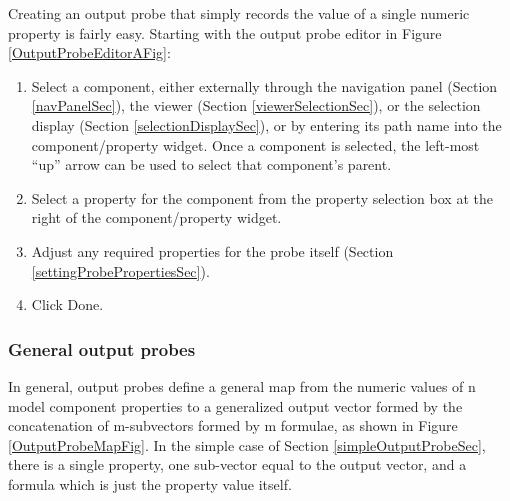 \documentclass{article}
\begin{document}
Creating an output probe that simply records the value of a single
numeric property is fairly easy. Starting with the output
probe editor in Figure \ref{OutputProbeEditorAFig}:

\begin{enumerate}

\item Select a component, either externally through the navigation panel
(Section \ref{navPanelSec}), the viewer (Section \ref{viewerSelectionSec}), or the selection
display (Section \ref{selectionDisplaySec}), or by entering its path name into the
component/property widget. Once a component is selected,
the left-most ``up'' arrow can be used to select that
component's parent.

\item Select a property for the component from the property
selection box at the right of the component/property widget.

\item Adjust any required properties for the probe itself 
(Section \ref{settingProbePropertiesSec}).

\item Click {\sf Done}.

\end{enumerate}

\subsubsection{General output probes}

In general, output probes define a general map from the numeric values
of n model component properties to a generalized output vector formed by the
concatenation of m-subvectors formed by m formulae, as shown
in Figure \ref{OutputProbeMapFig}. In the simple case of Section \ref{simpleOutputProbeSec},
there is a single property, one sub-vector equal to the output
vector, and a formula which is just the property value itself.
\end{document}
